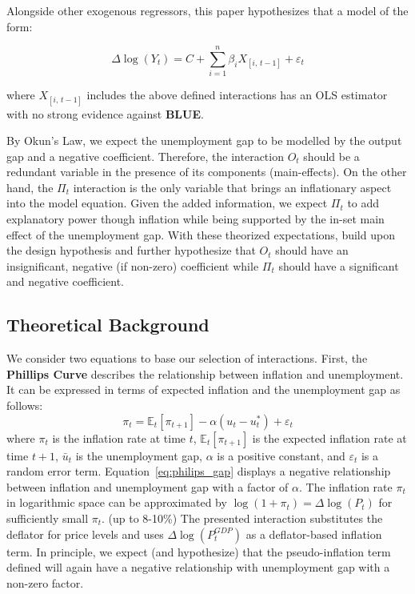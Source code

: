 \noindent Alongside other exogenous regressors, this paper hypothesizes that a model of the form:

\begin{equation}
    \label{eq:model_eq}
   \Delta \log(Y_t) = C + \sum_{i=1}^n \beta_i X_{[i, \, t-1]} + \varepsilon_t
\end{equation}

\noindent where $X_{[i, \, t-1]}$ includes the above defined interactions has an OLS estimator with no strong evidence against \textbf{BLUE}.

\vspace{\baselineskip}
By Okun's Law, we expect the unemployment gap to be modelled by the output gap and a negative coefficient.
Therefore, the interaction $O_t$ should be a redundant variable in the presence of its components (main-effects).
On the other hand, the $\Pi_t$ interaction is the only variable that brings an inflationary aspect into the model equation.
Given the added information, we expect $\Pi_t$ to add explanatory power though inflation while being supported by the in-set main effect of the unemployment gap.
With these theorized expectations, build upon the design hypothesis and further hypothesize that $O_t$ should have an insignificant, negative (if non-zero) coefficient while $\Pi_t$ should have a significant and negative coefficient.


\subsection{Theoretical Background}\label{subsec:theory}
We consider two equations to base our selection of interactions.
First, the \textbf{Phillips Curve} describes the relationship between inflation and unemployment.
It can be expressed in terms of expected inflation and the unemployment gap as follows:
\begin{equation}
    \pi_t = \mathbb{E}_t[\pi_{t+1}] - \alpha (u_t - u_t^*) + \varepsilon_t
    \label{eq:philips_gap}
\end{equation}
where $\pi_t$ is the inflation rate at time $t$, $\mathbb{E}_t[\pi_{t+1}]$ is the expected inflation rate at time $t+1$, $\bar{u}_t$ is the unemployment gap, $\alpha$ is a positive constant, and $\varepsilon_t$ is a random error term.
Equation~\ref{eq:philips_gap} displays a negative relationship between inflation and unemployment gap with a factor of $\alpha$.
The inflation rate $\pi_t$ in logarithmic space can be approximated by $\log(1 + \pi_t) = \Delta\log(P_t)$ for sufficiently small $\pi_t$. (up to 8-10\%)
The presented interaction substitutes the deflator for price levels and uses $\Delta\log(P_t^{GDP})$ as a deflator-based inflation term.
In principle, we expect (and hypothesize) that the pseudo-inflation term defined will again have a negative relationship with unemployment gap with a non-zero factor.

